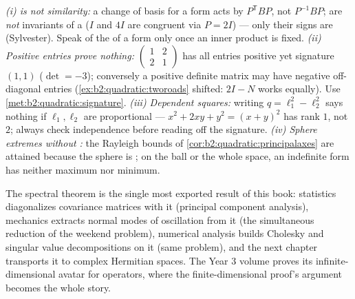 \begin{remark}
\emph{(i)  is not similarity:} a change of basis for
a form acts by $P^{\mathsf T}BP$, not $P^{-1}BP$; 
are \emph{not} invariants of a  ($I$ and $4I$
are congruent via $P = 2I$) --- only their signs are
(Sylvester). Speak of the  of a form only once an
inner product is fixed. \emph{(ii) Positive entries prove
nothing:} $\begin{pmatrix} 1 & 2\\ 2 & 1\end{pmatrix}$ has all
entries positive yet signature $(1,1)$ ($\det = -3$);
conversely a positive definite matrix may have negative
off-diagonal entries (\cref{ex:b2:quadratic:tworoads} shifted:
$2I - N$ works equally). Use
\cref{met:b2:quadratic:signature}. \emph{(iii) Dependent
squares:} writing $q = \ell_1^2 - \ell_2^2$ says nothing if
$\ell_1, \ell_2$ are proportional --- $x^2 + 2xy + y^2 =
(x+y)^2$ has rank $1$, not $2$; always check independence
before reading off the signature. \emph{(iv) Sphere extremes
without :} the Rayleigh bounds of
\cref{cor:b2:quadratic:principalaxes} are attained because the
sphere is ; on the  ball or the whole space, an
indefinite form has neither maximum nor minimum.
\end{remark}

\begin{remark}
The spectral theorem is the single most exported result of this
book: statistics diagonalizes covariance matrices with it
(principal component analysis), mechanics extracts normal modes
of oscillation from it (the simultaneous reduction of the
weekend problem), numerical analysis builds Cholesky and
singular value decompositions on it (same problem), and the next
chapter transports it to complex Hermitian spaces. The Year 3
volume proves its infinite-dimensional avatar for 
 operators, where the finite-dimensional proof's
 argument becomes the whole story.
\end{remark}

